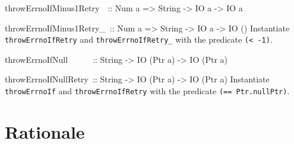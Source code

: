\documentclass[a4paper,twosides]{article}
\makeatletter
\newcommand{\code}[1]{\texttt{#1}}      %
\newenvironment{codedesc}{%
  \list{}{\labelwidth\z@
    \let\makelabel\codedesclabel}
  }{%
  \endlist
  }
\newcommand*{\codedesclabel}[1]{%
  \hspace{-\leftmargin}
  \parbox[b]{\labelwidth}{\makebox[0pt][l]{\code{#1}}\\}\hfil\relax
  }
\newcommand{\combineitems}{\vspace*{-\itemsep}\vspace*{-\parsep}\vspace*{-1em}}
\makeatother
\begin{document}
\begin{codedesc}
\item[throwErrnoIfMinus1Retry~~:: Num a => String -> IO a -> IO a]
\item[throwErrnoIfMinus1Retry\_~:: Num a => String -> IO a -> IO ()]%
  \combineitems Instantiate \code{throwErrnoIfRetry} and
  \code{throwErrnoIfRetry\_} with the predicate \code{(< -1)}.

\item[throwErrnoIfNull~~~~~~:: String -> IO (Ptr a) -> IO (Ptr a)]
\item[throwErrnoIfNullRetry~:: String -> IO (Ptr a) -> IO (Ptr a)]%
  \combineitems Instantiate \code{throwErrnoIf} and \code{throwErrnoIfRetry}
  with the predicate \code{(== Ptr.nullPtr)}.
\end{codedesc}


\appendix
\newpage
\section{Rationale}
\end{document}
